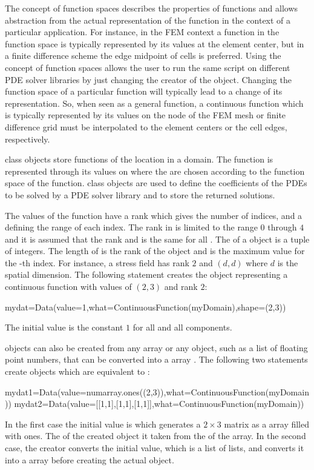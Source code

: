 The concept of function spaces describes the properties of 
functions and allows abstraction from the actual representation 
of the function in the context of a particular application. For instance, 
in the FEM context a
function in the \Function function space
is typically represented by its values at the element center, 
but in a finite difference scheme the edge midpoint of cells is preferred. 
Using the concept of function spaces 
allows the user to run the same script on different
PDE solver libraries by just changing the creator of the \Domain object.     
Changing the function space of a particular function
will typically lead to a change of its representation. 
So, when seen as a general function,
a continuous function which is typically represented by its values
on the node of the FEM mesh or finite difference grid 
must be interpolated to the element centers or the cell edges,
respectively.

\Data class objects store functions of the location in a domain. 
The function is represented through its values on \DataSamplePoints where
the \DataSamplePoints are chosen according to the function space 
of the function.  
\Data class objects are used to define the coefficients
of the PDEs to be solved by a PDE solver library 
and to store the returned solutions.

The values of the function have a rank which gives the
number of indices, and a \Shape defining the range of each index.
The rank in \escript is limited to the range $0$ through $4$ and
it is assumed that the rank and \Shape is the same for all \DataSamplePoints.
The \Shape of a \Data object is a tuple  of integers. The length
of  is the rank of the \Data object and  is the maximum
value for the -th index.
For instance, a stress field has rank $2$ and 
\Shape $(d,d)$ where $d$ is the spatial dimension.
The following statement creates the \Data object
 representing a 
continuous function with values 
of \Shape $(2,3)$ and rank $2$:
\begin{python}
mydat=Data(value=1,what=ContinuousFunction(myDomain),shape=(2,3))
\end{python}
The initial value is the constant $1$ for all \DataSamplePoints and
all components.

\Data objects can also be created from any \numarray
array or any object, such as a list of floating point numbers, 
that can be converted into a \numarray array . 
The following two statements
create objects which are equivalent to :
\begin{python}
mydat1=Data(value=numarray.ones((2,3)),what=ContinuousFunction(myDomain))
mydat2=Data(value=[[1,1],[1,1],[1,1]],what=ContinuousFunction(myDomain))
\end{python}
In the first case the initial value is 
which generates a $2 \times 3$ matrix as a \numarray array 
filled with ones. The \Shape of the created \Data object
it taken from the \Shape of the array. In the second
case, the creator converts the initial value, which is a list of lists,
and converts it into a \numarray array before creating the actual
\Data object.      

